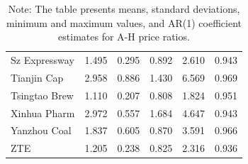 \documentclass[11pt]{article}
\begin{document}
\begin{table}[!t]
{\begin{tabular}{l@{\hskip 2cm}c@{\hskip 1.5cm}c@{\hskip 1.5cm}c@{\hskip 1.5cm}c @{\hskip 1.5cm} c @{\hskip 1cm}}
  Sz Expressway & 1.495 & 0.295 & 0.892 & 2.610 & 0.943 \\ 
  Tianjin Cap & 2.958 & 0.886 & 1.430 & 6.569 & 0.969 \\ 
  Tsingtao Brew & 1.110 & 0.207 & 0.808 & 1.824 & 0.951 \\ 
  Xinhua Pharm & 2.972 & 0.557 & 1.684 & 4.647 & 0.943 \\ 
  Yanzhou Coal & 1.837 & 0.605 & 0.870 & 3.591 & 0.966 \\ 
  ZTE & 1.205 & 0.238 & 0.825 & 2.316 & 0.936 \\ 
   \bottomrule
\end{tabular}
}
 \caption*{\scriptsize Note: The table presents means, standard deviations, minimum and maximum values, and AR(1) coefficient estimates for A-H price ratios.}

 \label{tab:descriptive}
\end{table}
\end{document}
